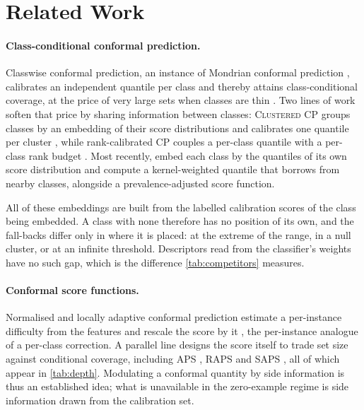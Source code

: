 \section{Related Work}
\label{sec:related}


\paragraph{Class-conditional conformal prediction.} Classwise conformal prediction, an
instance of Mondrian conformal prediction \cite{vovk2005algorithmic}, calibrates an
independent quantile per class and thereby attains class-conditional coverage, at the price of
very large sets when classes are thin \cite{sadinle2019least,lofstrom2015bias}. Two lines of
work soften that price by sharing information between classes: \textsc{Clustered} CP groups
classes by an embedding of their score distributions and calibrates one quantile per cluster
\cite{ding2023class}, while rank-calibrated CP couples a per-class quantile with a per-class
rank budget \cite{shi2024rank}. Most recently, \citet{ding2026conformal} embed each class by
the quantiles of its own score distribution and compute a kernel-weighted quantile that
borrows from nearby classes, alongside a prevalence-adjusted score function.

All of these embeddings are built from the labelled calibration scores of the class being
embedded. A class with none therefore has no position of its own, and the fall-backs differ only in
where it is placed: at the extreme of the range, in a null cluster, or at an infinite
threshold. Descriptors read from the classifier's weights have no such gap, which is the
difference \cref{tab:competitors} measures.

\paragraph{Conformal score functions.} Normalised and locally adaptive conformal prediction
estimate a per-instance difficulty from the features and rescale the score by it
\cite{lei2014distribution}, the per-instance analogue of a per-class correction. A parallel
line designs the score itself to trade set size against conditional coverage, including APS
\cite{romano2020classification}, RAPS \cite{angelopoulos2021uncertainty} and SAPS
\cite{huang2024conformal}, all of which appear in \cref{tab:depth}. Modulating a conformal
quantity by side information is thus an established idea; what is unavailable in the
zero-example regime is side information drawn from the calibration set.

